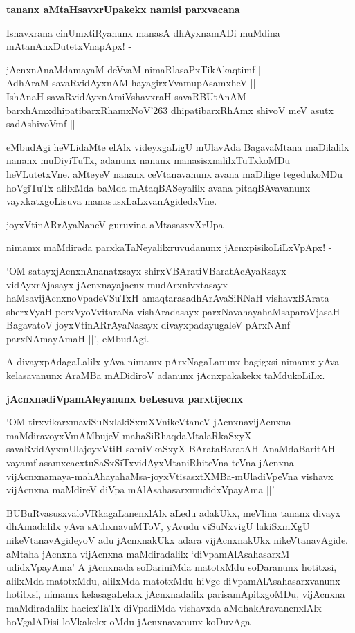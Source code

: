 \noindent
\textbf{tananx aMtaHsavxrUpakekx namisi parxvacana}\label{page80}

Ishavxrana cinUmxtiRyanunx manasA dhAyxnamADi muMdina mAtanAnxDutetxVnapApx! -

\begin{shloka}
jAcnxnAnaMdamayaM deVvaM nimaRlasaPxTikAkaqtimf |\\\label{80}
AdhAraM savaRvidAyxnAM hayagirxVvamupAsamxheV ||\\

IshAnaH savaRvidAyxnAmiVshavxraH savaRBUtAnAM\\\label{80}
barxhAmxdhipatibarxRhamxNoV\char'263 dhipatibarxRhAmx shivoV meV asutx sadAshivoVmf ||
\end{shloka}

eMbudAgi heVLidaMte elAlx videyxgaLigU mUlavAda BagavaMtana maDilalilx nananx muDiyiTuTx, adanunx nananx manasisxnalilxTuTxkoMDu heVLutetxVne. aMteyeV nananx ceVtanavanunx avana maDilige tegedukoMDu hoVgiTuTx alilxMda baMda mAtaqBASeyalilx avana pitaqBAvavanunx vayxkatxgoLisuva manasusxLaLxvanAgidedxVne.

\begin{shloka}
joyxVtinARrAyaNaneV guruvina aMtasasxvXrUpa
\end{shloka}

nimamx maMdirada parxkaTaNeyalilxruvudanunx jAcnxpisikoLiLxVpApx! - 

`OM satayxjAcnxnAnanatxsayx shirxVBAratiVBaratAcAyaRsayx vidAyxrAjasayx jAcnxnayajacnx mudArxnivxtasayx haMsavijAcnxnoVpadeVSuTxH amaqtarasadhArAvaSiRNaH vishavxBArata sherxVyaH perxVyoVvitaraNa vishAradasayx parxNavahayahaMsaparoVjasaH BagavatoV joyxVtinARrAyaNasayx divayxpadayugaleV pArxNAnf parxNAmayAmaH ||', eMbudAgi.

A divayxpAdagaLalilx yAva nimamx pArxNagaLanunx bagigxsi nimamx yAva kelasavanunx AraMBa mADidiroV adanunx jAcnxpakakekx taMdukoLiLx.

\noindent
\textbf{jAcnxnadiVpamAleyanunx beLesuva parxtijecnx}\label{page81}

`OM tirxvikarxmaviSuNxlakiSxmXVnikeVtaneV\label{81} jAcnxnavijAcnxna maMdiravoyxVmAMbujeV mahaSiRhaqdaMtalaRkaSxyX savaRvidAyxmUlajoyxVtiH samiVkaSxyX BArataBaratAH AnaMdaBaritAH vayamf asamxcacxtuSaSxSiTxvidAyxMtaniRhiteVna teVna jAcnxna-vijAcnxnamaya-mahAhayahaMsa-joyxVtisasxtXMBa-mUladiVpeVna vishavx vijAcnxna maMdireV diVpa mAlAsahasarxmudidxVpayAma ||'

BUBuRvasusxvaloVRkagaLanenxlAlx aLedu adakUkx, meVlina tananx divayx dhAmadalilx yAva sAthxnavuMToV, yAvudu viSuNxvigU lakiSxmXgU nikeVtanavAgideyoV adu jAcnxnakUkx adara vijAcnxnakUkx nikeVtanavAgide. aMtaha jAcnxna vijAcnxna maMdiradalilx `diVpamAlAsahasarxM udidxVpayAma' A jAcnxnada soDariniMda matotxMdu soDaranunx hotitxsi, alilxMda matotxMdu, alilxMda matotxMdu hiVge diVpamAlAsahasarxvanunx hotitxsi, nimamx kelasagaLelalx jAcnxnadalilx parisamApitxgoMDu, vijAcnxna maMdiradalilx hacicxTaTx diVpadiMda vishavxda aMdhakAravanenxlAlx hoVgalADisi loVkakekx oMdu jAcnxnavanunx koDuvAga - 

